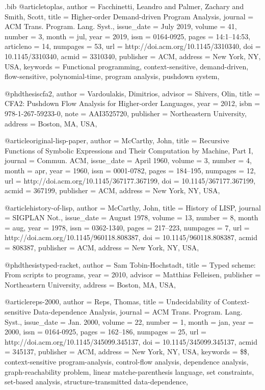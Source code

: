 \documentclass[12pt, oneside]{book}
\begin{document}
\begin{filecontents*}{\jobname.bib}
@article{toplas,
 author = {Facchinetti, Leandro and Palmer, Zachary and Smith, Scott},
 title = {Higher-order Demand-driven Program Analysis},
 journal = {ACM Trans. Program. Lang. Syst.},
 issue_date = {July 2019},
 volume = {41},
 number = {3},
 month = jul,
 year = {2019},
 issn = {0164-0925},
 pages = {14:1--14:53},
 articleno = {14},
 numpages = {53},
 url = {http://doi.acm.org/10.1145/3310340},
 doi = {10.1145/3310340},
 acmid = {3310340},
 publisher = {ACM},
 address = {New York, NY, USA},
 keywords = {Functional programming, context-sensitive, demand-driven, flow-sensitive, polynomial-time, program analysis, pushdown system},
}

@phdthesis{cfa2,
  author = {Vardoulakis, Dimitrios},
  advisor = {Shivers, Olin},
  title = {CFA2: Pushdown Flow Analysis for Higher-order Languages},
  year = {2012},
  isbn = {978-1-267-59233-0},
  note = {AAI3525720},
  publisher = {Northeastern University},
  address = {Boston, MA, USA},
}

@article{original-lisp-paper,
  author = {McCarthy, John},
  title = {Recursive Functions of Symbolic Expressions and Their Computation by Machine, Part I},
  journal = {Commun. ACM},
  issue_date = {April 1960},
  volume = {3},
  number = {4},
  month = apr,
  year = {1960},
  issn = {0001-0782},
  pages = {184--195},
  numpages = {12},
  url = {http://doi.acm.org/10.1145/367177.367199},
  doi = {10.1145/367177.367199},
  acmid = {367199},
  publisher = {ACM},
  address = {New York, NY, USA},
}

@article{history-of-lisp,
  author = {McCarthy, John},
  title = {History of LISP},
  journal = {SIGPLAN Not.},
  issue_date = {August 1978},
  volume = {13},
  number = {8},
  month = aug,
  year = {1978},
  issn = {0362-1340},
  pages = {217--223},
  numpages = {7},
  url = {http://doi.acm.org/10.1145/960118.808387},
  doi = {10.1145/960118.808387},
  acmid = {808387},
  publisher = {ACM},
  address = {New York, NY, USA},
}

@phdthesis{typed-racket,
  author = {Sam Tobin-Hochstadt},
  title = {Typed scheme: From scripts to programs},
  year = {2010},
  advisor = {Matthias Felleisen},
  publisher = {Northeastern University},
  address = {Boston, MA, USA},
}

@article{reps-2000,
  author = {Reps, Thomas},
  title = {Undecidability of Context-sensitive Data-dependence Analysis},
  journal = {ACM Trans. Program. Lang. Syst.},
  issue_date = {Jan. 2000},
  volume = {22},
  number = {1},
  month = jan,
  year = {2000},
  issn = {0164-0925},
  pages = {162--186},
  numpages = {25},
  url = {http://doi.acm.org/10.1145/345099.345137},
  doi = {10.1145/345099.345137},
  acmid = {345137},
  publisher = {ACM},
  address = {New York, NY, USA},
  keywords = {{\$\infty\$}, context-sensitive program-analysis, control-flow analysis, dependence analysis, graph-reachability problem, linear matche-parenthesis language, set constraints, set-based analysis, structure-transmitted data-dependence},
} 


\end{filecontents*}
\end{document}
